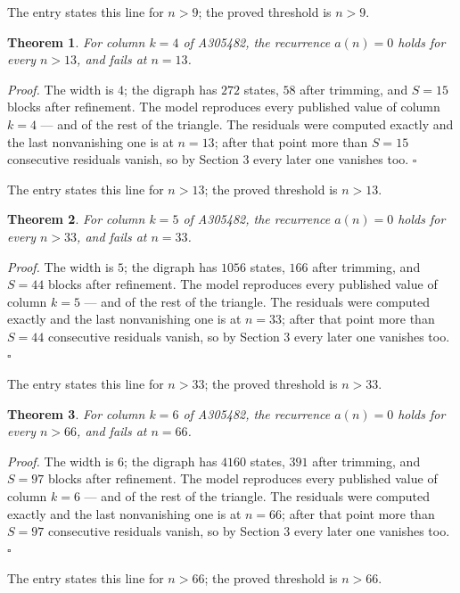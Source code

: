 \documentclass[11pt]{article}
\newtheorem{theorem}{Theorem}
\theoremstyle{definition}
\begin{document}
The entry states this line for $n > 9$; the proved threshold is $n > 9$.

\begin{theorem} For column $k = 4$ of A305482, the recurrence $a(n) = 0$ holds for every $n > 13$, and fails at $n = 13$.\end{theorem}

{\itshape Proof.} The width is $4$; the digraph has $272$ states, $58$ after trimming, and $S = 15$ blocks after refinement. The model reproduces every published value of column $k = 4$ --- and of the rest of the triangle. The residuals were computed exactly and the last nonvanishing one is at $n = 13$; after that point more than $S = 15$ consecutive residuals vanish, so by Section 3 every later one vanishes too. $\square$

The entry states this line for $n > 13$; the proved threshold is $n > 13$.

\begin{theorem} For column $k = 5$ of A305482, the recurrence $a(n) = 0$ holds for every $n > 33$, and fails at $n = 33$.\end{theorem}

{\itshape Proof.} The width is $5$; the digraph has $1056$ states, $166$ after trimming, and $S = 44$ blocks after refinement. The model reproduces every published value of column $k = 5$ --- and of the rest of the triangle. The residuals were computed exactly and the last nonvanishing one is at $n = 33$; after that point more than $S = 44$ consecutive residuals vanish, so by Section 3 every later one vanishes too. $\square$

The entry states this line for $n > 33$; the proved threshold is $n > 33$.

\begin{theorem} For column $k = 6$ of A305482, the recurrence $a(n) = 0$ holds for every $n > 66$, and fails at $n = 66$.\end{theorem}

{\itshape Proof.} The width is $6$; the digraph has $4160$ states, $391$ after trimming, and $S = 97$ blocks after refinement. The model reproduces every published value of column $k = 6$ --- and of the rest of the triangle. The residuals were computed exactly and the last nonvanishing one is at $n = 66$; after that point more than $S = 97$ consecutive residuals vanish, so by Section 3 every later one vanishes too. $\square$

The entry states this line for $n > 66$; the proved threshold is $n > 66$.
\end{document}
